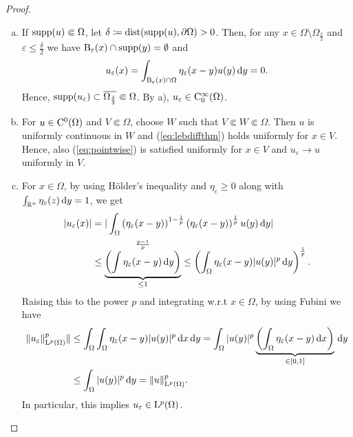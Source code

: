 \begin{proof}
\begin{enumerate}[a)]
    \item If $\operatorname{supp}(u) \Subset \Omega$, let $\delta \coloneqq \operatorname{dist}(\operatorname{supp}(u), \partial \Omega) > 0$.
    Then, for any $x \in \Omega \setminus \Omega_{\frac{\delta}{2}}$ and $\varepsilon \leq \frac{\delta}{2}$ we have $\mathrm{B}_\varepsilon(x) \cap \operatorname{supp}(y) = \emptyset$ and 
    $$
    u_\varepsilon(x) = \int_{\mathrm{B}_\varepsilon(x) \cap \Omega} \eta_\varepsilon(x - y) u(y) \, {\operatorname{d}\!{y}} = 0.
    $$
    Hence, $\operatorname{supp}(u_\varepsilon) \subset \overline{\Omega_{\frac{\delta}{3}}} \Subset \Omega$.
    By a), $u_\varepsilon \in \mathrm{C}_0^\infty(\Omega)$.

    \item For $u \in \mathrm{C}^0(\Omega)$ and $V \Subset \Omega$, choose $W$ such that $V \Subset W \Subset \Omega$.
    Then $u$ is uniformly continuous in $W$ and (\ref{eq:lebdiffthm}) holds uniformly for $x \in V$.
    Hence, also (\ref{eq:pointwise}) is satisfied uniformly for $x \in V$ and $u_\varepsilon \to u$ uniformly in $V$.

    \item For $x \in \Omega$, by using Hölder's inequality and $\eta_\varepsilon \geq 0$ along with $\int_{\mathbb{R}^n} \eta_\varepsilon(z) \, {\operatorname{d}\!{y}} = 1$, we get
    \begin{align*}
      |u_\varepsilon(x)| 
      &= | \int_\Omega \left( \eta_\varepsilon(x - y) \right)^{1 - \frac{1}{p}} \left( \eta_\varepsilon(x - y)\right)^{\frac{1}{p}} u(y) \, {\operatorname{d}\!{y}} | \\
      &\leq \underbrace{\left( \int \eta_\varepsilon(x -y) \, {\operatorname{d}\!{y}}\right)}_{\leq 1}^{\frac{p - 1}{p}}
      \leq \left( \int_\Omega \eta_\varepsilon (x - y) |u(y)|^p \, {\operatorname{d}\!{y}} \right)^{\frac{1}{p}}.
    \end{align*}
    Raising this to the power $p$ and integrating w.r.t $x \in \Omega$, by using Fubini we have
    \begin{align}
      \|u_\varepsilon\|_{\mathrm{L}^p(\Omega)}^p \|
      &\leq \int_\Omega\int_\Omega \eta_\varepsilon(x - y) |u(y)|^p \, {\operatorname{d}\!{x}} \, {\operatorname{d}\!{y}}
      = \int_\Omega |u(y)|^p \underbrace{\left( \int_\Omega \eta_\varepsilon(x -y) \, {\operatorname{d}\!{x}} \right)}_{\in [0,1]} \, {\operatorname{d}\!{y}} \nonumber\\
      &\leq \int_\Omega |u(y)|^p \, {\operatorname{d}\!{y}} = \|u\|_{\mathrm{L}^p(\Omega)}^p.
      \label{eq:lpinequality}
    \end{align}
    In particular, this implies $u_\varepsilon \in \mathrm{L}^p(\Omega)$.


\end{enumerate}
\end{proof}
